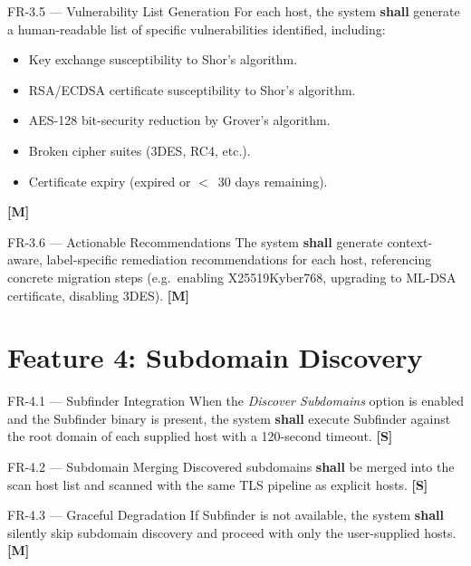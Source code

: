 \begin{reqbox}{FR-3.5 — Vulnerability List Generation}
  For each host, the system \textbf{shall} generate a human-readable list of
  specific vulnerabilities identified, including:
  \begin{itemize}[noitemsep]
    \item Key exchange susceptibility to Shor's algorithm.
    \item RSA/ECDSA certificate susceptibility to Shor's algorithm.
    \item AES-128 bit-security reduction by Grover's algorithm.
    \item Broken cipher suites (3DES, RC4, etc.).
    \item Certificate expiry (expired or $<$~30 days remaining).
  \end{itemize}
  \hfill \textbf{[M]}
\end{reqbox}

\begin{reqbox}{FR-3.6 — Actionable Recommendations}
  The system \textbf{shall} generate context-aware, label-specific remediation
  recommendations for each host, referencing concrete migration steps
  (e.g.\ enabling X25519Kyber768, upgrading to ML-DSA certificate,
  disabling 3DES). \hfill \textbf{[M]}
\end{reqbox}

\section{Feature 4: Subdomain Discovery}
\label{sec:fr_subdomain}

\begin{reqbox}{FR-4.1 — Subfinder Integration}
  When the \textit{Discover Subdomains} option is enabled and the Subfinder
  binary is present, the system \textbf{shall} execute Subfinder against the
  root domain of each supplied host with a 120-second timeout. \hfill \textbf{[S]}
\end{reqbox}

\begin{reqbox}{FR-4.2 — Subdomain Merging}
  Discovered subdomains \textbf{shall} be merged into the scan host list and
  scanned with the same TLS pipeline as explicit hosts. \hfill \textbf{[S]}
\end{reqbox}

\begin{reqbox}{FR-4.3 — Graceful Degradation}
  If Subfinder is not available, the system \textbf{shall} silently skip
  subdomain discovery and proceed with only the user-supplied hosts.
  \hfill \textbf{[M]}
\end{reqbox}

